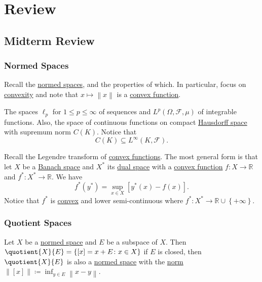 \chapter{Review}
\section{Midterm Review}\label{sec:mid-review}
\subsection{Normed Spaces}
Recall the \hyperref[def:normed-vector-space]{normed spaces}, and the properties of which. In particular, focus on \hyperref[def:convex-function]{convexity} and note that \(x\mapsto \left\lVert x\right\rVert \) is a \hyperref[def:convex-function]{convex function}.

\begin{eg}
	The spaces \(\ell _p\) for \(1 \leq p \leq \infty \) of sequences and \(L^p(\Omega , \mathcal{F} , \mu )\) of integrable functions. Also, the space of continuous functions on compact \hyperref[def:Hausdorff]{Hausdorff space} with supremum norm \(C(K)\). Notice that
	\[
		C(K) \subseteq L^{\infty} (K, \mathcal{F}).
	\]
\end{eg}

\begin{remark}
	Recall the Legendre transform of \hyperref[def:convex-function]{convex functions}. The most general form is that let \(X\) be a \hyperref[def:Banach-space]{Banach space} and \(X^{\ast} \) its \hyperref[def:dual-space]{dual space} with a \hyperref[def:convex-function]{convex function} \(f\colon X\to \mathbb{R} \) and \(f^{\ast} \colon X^{\ast} \to \mathbb{R} \). We have
	\[
		f^{\ast} (y^{\ast} ) = \sup _{x\in X}\left[ y^{\ast} (x) - f (x) \right].
	\]
	Notice that \(f^{\ast} \) is \hyperref[def:convex-function]{convex} and lower semi-continuous where \(f^{\ast} \colon X^{\ast} \to \mathbb{R} \cup \left\{ +\infty  \right\} \).
\end{remark}

\subsection{Quotient Spaces}
Let \(X\) be a \hyperref[def:normed-vector-space]{normed space} and \(E\) be a subspace of \(X\). Then \(\quotient{X}{E} = \left\{ [x] = x+E\colon x\in X \right\}  \) if \(E\) is closed, then \(\quotient{X}{E} \) is also a \hyperref[def:normed-vector-space]{normed space} with the \hyperref[def:norm]{norm} \(\left\lVert [x]\right\rVert \coloneqq \inf _{y\in E}\left\lVert x- y\right\rVert\).

